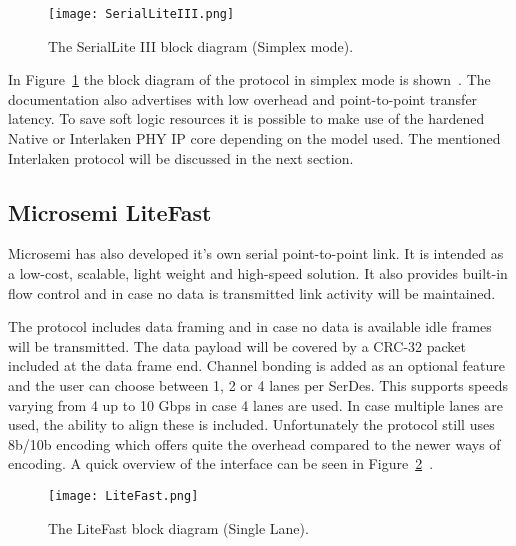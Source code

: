 \begin{figure}[ht]
	\centering
	\texttt{[image: SerialLiteIII.png]}	
	\caption{The SerialLite III block diagram (Simplex mode).}
	\label{fig:SerialLiteIII_Block}
\end{figure}

In Figure~\ref{fig:SerialLiteIII_Block} the block diagram of the protocol in simplex mode is shown~\cite{SerialLiteIII_IpCore}. The documentation also advertises with low overhead and point-to-point transfer latency. To save soft logic resources it is possible to make use of the hardened Native or Interlaken PHY IP core depending on the model used. The mentioned Interlaken protocol will be discussed in the next section.

\subsection{Microsemi LiteFast}
Microsemi has also developed it's own serial point-to-point link. It is intended as a low-cost, scalable, light weight and high-speed solution. It also provides built-in flow control and in case no data is transmitted link activity will be maintained. 

The protocol includes data framing and in case no data is available idle frames will be transmitted. The data payload will be covered by a CRC-32 packet included at the data frame end. Channel bonding is added as an optional feature and the user can choose between 1, 2 or 4 lanes per SerDes. This supports speeds varying from 4 up to 10 Gbps in case 4 lanes are used. In case multiple lanes are used, the ability to align these is included. Unfortunately the protocol still uses 8b/10b encoding which offers quite the overhead compared to the newer ways of encoding. 
A quick overview of the interface can be seen in Figure~\ref{fig:LiteFast_Block}~\cite{LiteFast_IpCore}.

\begin{figure}[ht]
	\centering
	\texttt{[image: LiteFast.png]}	
	\caption{The LiteFast block diagram (Single Lane).}
	\label{fig:LiteFast_Block}
\end{figure}

